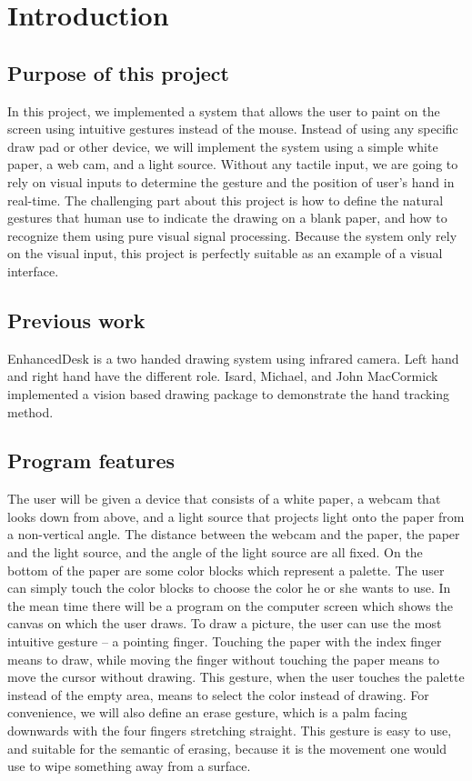 \section{Introduction}
\subsection{Purpose of this project}
    In this project, we implemented a system that allows the user to paint on the screen using intuitive gestures instead of the mouse. 
    Instead of using any specific draw pad or other device, we will implement the system using a simple white paper, a web cam, and a light source. 
    Without any tactile input, we are going to rely on visual inputs to determine the gesture and the position of user's hand in real-time. 
    The challenging part about this project is how to define the natural gestures that human use to indicate the drawing on a  blank paper, and how to recognize them using pure visual signal processing. Because the system only rely on the visual input, this project is perfectly suitable as an example of a visual interface. 
\subsection{Previous work}
    EnhancedDesk\cite{a} is a two handed drawing system using infrared camera. Left hand and right hand have the different role.  Isard, Michael, and John MacCormick implemented a vision based drawing package to demonstrate the hand tracking method\cite{b}.
\subsection{Program features}
The user will be given a device that consists of a white paper, a webcam that looks down from above, 
and a light source that projects light onto the paper from a non-vertical angle.
The distance between the webcam and the paper, the paper and the light source, and the angle of the light source are all fixed. On the bottom of the paper are some color blocks which represent a palette. The user can simply touch the color blocks to choose the color he or she wants to use. In the mean time there will be a program on the computer screen which shows the canvas on which the user draws. 
To draw a picture, the user can use the most intuitive gesture -- a pointing finger. 
Touching the paper with the index finger means to draw, while moving the finger without touching the paper means to move the cursor without drawing. 
This gesture, when the user touches the palette instead of the empty area, means to select the color  instead of drawing. 
For convenience, we will also define an erase gesture, which is a palm facing downwards with the four fingers stretching straight. This gesture is easy to use, and suitable for the semantic of erasing, because it is the movement one would use to wipe something away from a surface.
